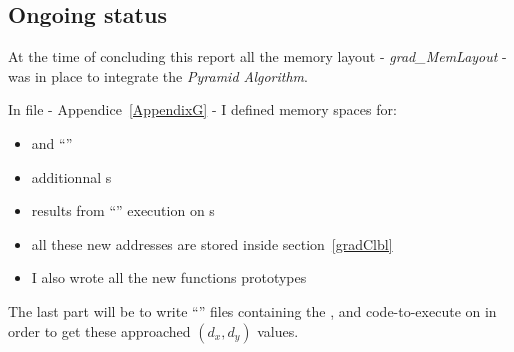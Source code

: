 \subsection{Ongoing status}

At the time of concluding this report all the memory layout - \emph{grad\_MemLayout} - was in place to integrate the \emph{Pyramid Algorithm}.

In  file - Appendice~\ref{AppendixG} - I defined \ram{} memory spaces for:
\begin{itemize}
	\item {} and  \enquote{}
	\item additionnal \uni{}s
	\item results from \enquote{} execution on \qpu{}s
	\item all these new addresses are stored inside  section~\ref{gradClbl}
	\item I also wrote all the new functions prototypes
\end{itemize}

The last part will be to write \enquote{} files containing the ,  and  code-to-execute on \vc{} in order to get these approached $(d_{x},d_{y})$ values.

